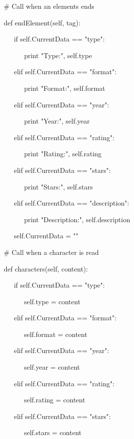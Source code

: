 \documentclass{wileySix}
\begin{document}
\begin{myEnumerate}
	\vspace{12pt}
	\noindent 
	~~  $  \#  $ Call when an elements ends \par
	\noindent 
	~~ def endElement(self, tag): \par
	\noindent 
	~~~~~ if self.CurrentData == "type": \par
	\noindent 
	~~~~~~~~ print "Type:", self.type \par
	\noindent 
	~~~~~ elif self.CurrentData == "format": \par
	\noindent 
	~~~~~~~~ print "Format:", self.format \par
	\noindent 
	~~~~~ elif self.CurrentData == "year": \par
	\noindent 
	~~~~~~~~ print "Year:", self.year \par
	\noindent 
	~~~~~ elif self.CurrentData == "rating": \par
	\noindent 
	~~~~~~~~ print "Rating:", self.rating \par
	\noindent 
	~~~~~ elif self.CurrentData == "stars": \par
	\noindent 
	~~~~~~~~ print "Stars:", self.stars \par
	\noindent 
	~~~~~ elif self.CurrentData == "description": \par
	\noindent 
	~~~~~~~~ print "Description:", self.description \par
	\noindent 
	~~~~~ self.CurrentData = "" \par
	\vspace{12pt}
	\noindent 
	~~  $  \#  $ Call when a character is read \par
	\noindent 
	~~ def characters(self, content): \par
	\noindent 
	~~~~~ if self.CurrentData == "type": \par
	\noindent 
	~~~~~~~~ self.type = content \par
	\noindent 
	~~~~~ elif self.CurrentData == "format": \par
	\noindent 
	~~~~~~~~ self.format = content \par
	\noindent 
	~~~~~ elif self.CurrentData == "year": \par
	\noindent 
	~~~~~~~~ self.year = content \par
	\noindent 
	~~~~~ elif self.CurrentData == "rating": \par
	\noindent 
	~~~~~~~~ self.rating = content \par
	\noindent 
	~~~~~ elif self.CurrentData == "stars": \par
	\noindent 
	~~~~~~~~ self.stars = content \par

\end{myEnumerate}
\end{document}
